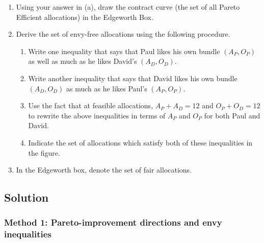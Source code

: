 \documentclass[12pt]{article}
\begin{document}
\begin{enumerate}[label=(\alph*)]
    (To make the drawing simpler, you can assume for simplicity that the points are such that C,A,D form a straight line with slope \(-2\) while B,A,E form a straight line with slope \(-1/2\))
    \item Using your answer in (a), draw the contract curve (the set of all Pareto Efficient allocations) in the Edgeworth Box.
    \item Derive the set of envy-free allocations using the following procedure.
    \begin{enumerate}[label=\Roman*.]
        \item Write one inequality that says that Paul likes his own bundle \((A_P,O_P)\) as well as much as he likes David's \((A_D,O_D)\).
        \item Write another inequality that says that David likes his own bundle \((A_D,O_D)\) as much as he likes Paul's \((A_P,O_P)\).
        \item Use the fact that at feasible allocations, \(A_P + A_D = 12\) and \(O_P + O_D =12\) to rewrite the above inequalities in terms of \(A_P\) and \(O_P\) for both Paul and David.
        \item Indicate the set of allocations which satisfy both of these inequalities in the figure.
    \end{enumerate}
    \item In the Edgeworth box, denote the set of fair allocations.
\end{enumerate}

\newpage
\subsection{Solution}

\subsubsection{Method 1: Pareto-improvement directions and envy inequalities}
\end{document}
